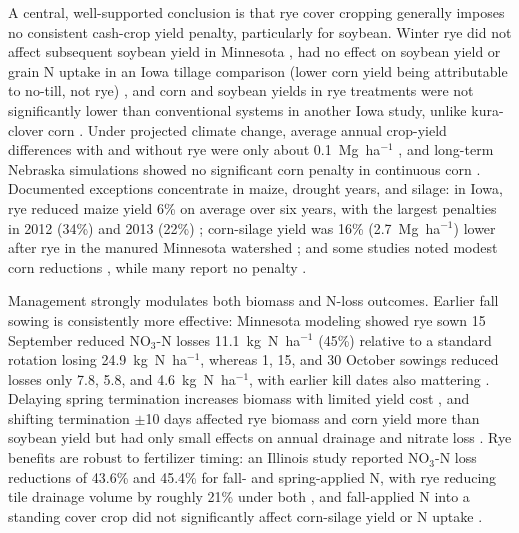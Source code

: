 A central, well-supported conclusion is that rye cover cropping generally imposes no consistent cash-crop yield penalty, particularly for soybean. Winter rye did not affect subsequent soybean yield in Minnesota \parencite{Strock2004}, had no effect on soybean yield or grain N uptake in an Iowa tillage comparison (lower corn yield being attributable to no-till, not rye) \parencite{Waring2020}, and corn and soybean yields in rye treatments were not significantly lower than conventional systems in another Iowa study, unlike kura-clover corn \parencite{Qi2011b}. Under projected climate change, average annual crop-yield differences with and without rye were only about 0.1~Mg~ha$^{-1}$ \parencite{Malone2020}, and long-term Nebraska simulations showed no significant corn penalty in continuous corn \parencite{Birru2023}. Documented exceptions concentrate in maize, drought years, and silage: in Iowa, rye reduced maize yield 6\% on average over six years, with the largest penalties in 2012 (34\%) and 2013 (22\%) \parencite{MartinezFeria2016}; corn-silage yield was 16\% (2.7~Mg~ha$^{-1}$) lower after rye in the manured Minnesota watershed \parencite{Krueger2013}; and some studies noted modest corn reductions \parencite{Ruffatti2019,Dougherty2020}, while many report no penalty \parencite{OBrien2022,PrezaFontes2021,Gentry2025}.

Management strongly modulates both biomass and N-loss outcomes. Earlier fall sowing is consistently more effective: Minnesota modeling showed rye sown 15 September reduced NO$_3$-N losses 11.1~kg~N~ha$^{-1}$ (45\%) relative to a standard rotation losing 24.9~kg~N~ha$^{-1}$, whereas 1, 15, and 30 October sowings reduced losses only 7.8, 5.8, and 4.6~kg~N~ha$^{-1}$, with earlier kill dates also mattering \parencite{Feyereisen2006b}. Delaying spring termination increases biomass with limited yield cost \parencite{Birru2023}, and shifting termination $\pm$10 days affected rye biomass and corn yield more than soybean yield but had only small effects on annual drainage and nitrate loss \parencite{Chatterjee2025}. Rye benefits are robust to fertilizer timing: an Illinois study reported NO$_3$-N loss reductions of 43.6\% and 45.4\% for fall- and spring-applied N, with rye reducing tile drainage volume by roughly 21\% under both \parencite{Gupta2022}, and fall-applied N into a standing cover crop did not significantly affect corn-silage yield or N uptake \parencite{Lacey2015}.

